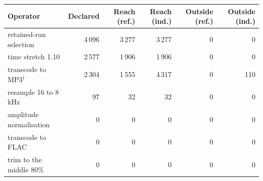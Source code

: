 \begin{tabular}{lrrrrr}
\toprule
Operator & Declared & Reach (ref.) & Reach (ind.) & Outside (ref.) & Outside (ind.) \\
\midrule
retained-run selection & 4\,096 & 3\,277 & 3\,277 & 0 & 0 \\
time stretch 1.10 & 2\,577 & 1\,906 & 1\,906 & 0 & 0 \\
transcode to MP3$^{\dagger}$ & 2\,304 & 1\,555 & 4\,317 & 0 & 110 \\
resample 16 to 8 kHz & 97 & 32 & 32 & 0 & 0 \\
amplitude normalisation & 0 & 0 & 0 & 0 & 0 \\
transcode to FLAC & 0 & 0 & 0 & 0 & 0 \\
trim to the middle 80\% & 0 & 0 & 0 & 0 & 0 \\
\bottomrule
\end{tabular}
